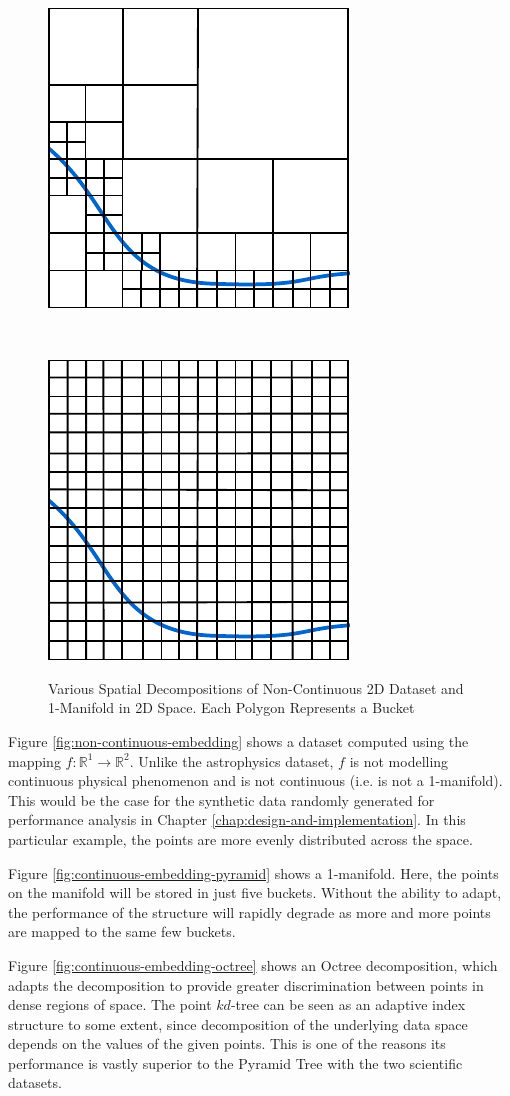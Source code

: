 \begin{figure}
\begin{center}
\begin{subfloat}{%
			\includegraphics[scale=0.65]{figures/1d_manifold_octree.pdf}
		}
		\end{subfloat}~~~~~
		\begin{subfloat}{%
			\includegraphics[scale=0.65]{figures/1d_manifold_multigrid.pdf}
		}
		\end{subfloat}
	\end{center}

	\caption{Various Spatial Decompositions of Non-Continuous 2D Dataset and 1-Manifold in 2D Space. Each Polygon Represents a Bucket}
	\label{fig:static-adaptive-decomposition}
\end{figure}

Figure \ref{fig:non-continuous-embedding} shows a dataset computed using the mapping $f : \mathbb{R}^1 \rightarrow \mathbb{R}^2$. Unlike the astrophysics dataset, $f$ is not modelling continuous physical phenomenon and is not continuous (i.e. is not a 1-manifold). This would be the case for the synthetic data randomly generated for performance analysis in Chapter \ref{chap:design-and-implementation}. In this particular example, the points are more evenly distributed across the space.

Figure \ref{fig:continuous-embedding-pyramid} shows a 1-manifold. Here, the points on the manifold will be stored in just five buckets. Without the ability to adapt, the performance of the structure will rapidly degrade as more and more points are mapped to the same few buckets.

Figure \ref{fig:continuous-embedding-octree} shows an Octree decomposition, which adapts the decomposition to provide greater discrimination between points in dense regions of space. The point $kd$-tree can be seen as an adaptive index structure to some extent, since decomposition of the underlying data space depends on the values of the given points. This is one of the reasons its performance is vastly superior to the Pyramid Tree with the two scientific datasets.


